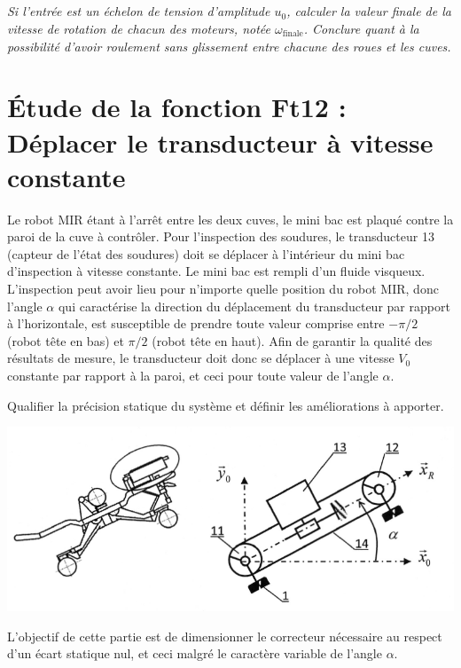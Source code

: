 \documentclass[10pt,fleqn]{article} %
\begin{document}
\subparagraph{}
\textit{Si l’entrée est un échelon de tension d’amplitude $u_0$, calculer la valeur finale de la vitesse de rotation de chacun des moteurs, notée $\omega_\text{finale}$. Conclure quant à la possibilité d’avoir roulement sans glissement entre chacune des roues et les cuves.}
\ifprof
\begin{corrige}
\end{corrige}
\else
\fi

\section{Étude de la fonction Ft12 : Déplacer le transducteur à vitesse constante}

Le robot MIR étant à l’arrêt entre les deux cuves, le mini bac est plaqué contre la paroi de la cuve à contrôler. Pour l’inspection des soudures, le transducteur 13 (capteur de l’état des soudures) doit se déplacer à l’intérieur du mini bac d’inspection à vitesse constante. Le mini bac est rempli d’un fluide visqueux. L’inspection peut avoir lieu pour n’importe quelle position du robot MIR, donc l’angle $\alpha$ qui caractérise la direction du déplacement du transducteur par rapport à l’horizontale, est susceptible de prendre toute valeur comprise entre $-\pi/2$ (robot tête en bas) et $\pi/2$ (robot tête en haut). Afin de garantir la qualité des résultats de mesure, le transducteur doit donc se déplacer à une vitesse $V_0$ constante par rapport à la paroi, et ceci pour toute valeur de l’angle $\alpha$.

\begin{obj}
Qualifier la précision statique du système et définir les améliorations à apporter.
\end{obj}

\begin{center}
	\includegraphics[width=\linewidth]{images/fig_12}
\end{center}

L’objectif de cette partie est de dimensionner le correcteur nécessaire au respect d’un écart statique nul, et ceci malgré le caractère variable de l’angle $\alpha$.
\end{document}
